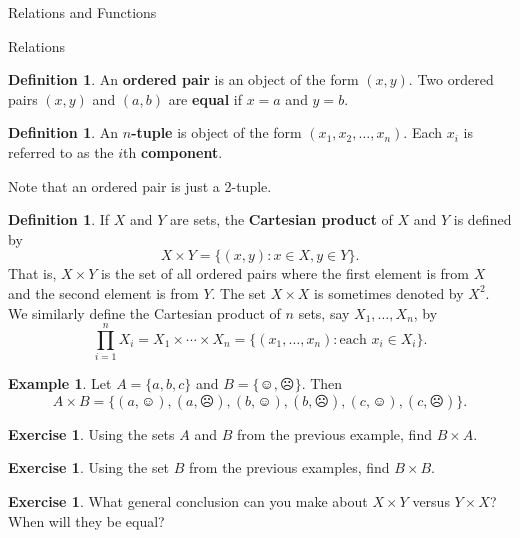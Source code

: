 \documentclass[11pt]{article}
\theoremstyle{definition}
\newtheorem{definition}[theorem]{Definition}
\newtheorem{example}[theorem]{Example}
\newtheorem{exercise}[theorem]{Exercise}
\begin{document}
\addtocounter{section}{2}

\begin{section}{Relations and Functions}


\begin{subsection}{Relations}

\begin{definition}
An \textbf{ordered pair} is an object of the form $(x,y)$. Two ordered pairs $(x,y)$ and $(a,b)$ are \textbf{equal} if $x=a$ and $y=b$. 
\end{definition}

\begin{definition}
An \textbf{$n$-tuple} is object of the form $(x_1, x_2,\ldots,x_n)$.  Each $x_i$ is referred to as the $i$th \textbf{component}.
\end{definition}

Note that an ordered pair is just a 2-tuple.

\begin{definition}
If $X$ and $Y$ are sets, the \textbf{Cartesian product} of $X$ and $Y$ is defined by
\[
X\times Y=\{(x,y): x\in X, y\in Y\}.
\]
That is, $X\times Y$ is the set of all ordered pairs where the first element is from $X$ and the second element is from $Y$.  The set $X\times X$ is sometimes denoted by $X^2$.  We similarly define the Cartesian product of $n$ sets, say $X_1, \ldots, X_n$, by
\[
\prod_{i=1}^{n} X_i=X_1\times \cdots \times X_n=\{(x_1,\ldots,x_n): \mbox{each } x_i\in X_i\}.
\]
\end{definition}

\begin{example}
Let $A=\{a,b,c\}$ and $B=\{\smiley,\frownie\}$.  Then 
\[
A\times B=\{(a,\smiley), (a,\frownie),(b,\smiley),(b,\frownie), (c,\smiley),(c,\frownie)\}.
\]
\end{example}

\begin{exercise}
Using the sets $A$ and $B$ from the previous example, find $B\times A$.  
\end{exercise}

\begin{exercise}
Using the set $B$ from the previous examples, find $B\times B$.  
\end{exercise}

\begin{exercise}
What general conclusion can you make about $X\times Y$ versus $Y\times X$?  When will they be equal?
\end{exercise}


\end{subsection}
\end{section}
\end{document}
